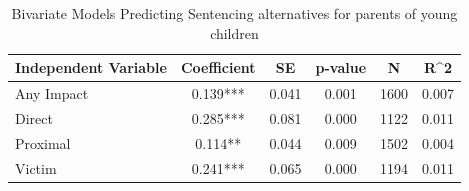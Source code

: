 \begin{table}

\caption{\label{tab:tab:alt_sentencing_bivariate}Bivariate Models Predicting Sentencing alternatives for parents of young children}
\centering
\begin{tabular}[t]{lccccc}
\toprule
Independent Variable & Coefficient & SE & p-value & N & R\textasciicircum{}2\\
\midrule
Any Impact & 0.139*** & 0.041 & 0.001 & 1600 & 0.007\\
Direct & 0.285*** & 0.081 & 0.000 & 1122 & 0.011\\
Proximal & 0.114** & 0.044 & 0.009 & 1502 & 0.004\\
Victim & 0.241*** & 0.065 & 0.000 & 1194 & 0.011\\
\bottomrule
\end{tabular}
\end{table}
